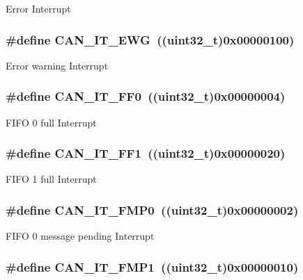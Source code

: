 \label{group__CAN__interrupts_ga65f1781c9165a2e9b5f77f1ed3990741}
Error Interrupt \hypertarget{group__CAN__interrupts_ga8a9f04ddf6ebe169d32b951a8ea135b3}{
\subsubsection[{CAN\_\-IT\_\-EWG}]{\setlength{\rightskip}{0pt plus 5cm}\#define CAN\_\-IT\_\-EWG~((uint32\_\-t)0x00000100)}}
\label{group__CAN__interrupts_ga8a9f04ddf6ebe169d32b951a8ea135b3}
Error warning Interrupt \hypertarget{group__CAN__interrupts_gabf63043d9216de80ddc7ffe57b23ef67}{
\subsubsection[{CAN\_\-IT\_\-FF0}]{\setlength{\rightskip}{0pt plus 5cm}\#define CAN\_\-IT\_\-FF0~((uint32\_\-t)0x00000004)}}
\label{group__CAN__interrupts_gabf63043d9216de80ddc7ffe57b23ef67}
FIFO 0 full Interrupt \hypertarget{group__CAN__interrupts_ga93b86d884ce0624b4b36c991fd75fc1c}{
\subsubsection[{CAN\_\-IT\_\-FF1}]{\setlength{\rightskip}{0pt plus 5cm}\#define CAN\_\-IT\_\-FF1~((uint32\_\-t)0x00000020)}}
\label{group__CAN__interrupts_ga93b86d884ce0624b4b36c991fd75fc1c}
FIFO 1 full Interrupt \hypertarget{group__CAN__interrupts_ga3fe6fbf53e9d692957e87ad329bcd362}{
\subsubsection[{CAN\_\-IT\_\-FMP0}]{\setlength{\rightskip}{0pt plus 5cm}\#define CAN\_\-IT\_\-FMP0~((uint32\_\-t)0x00000002)}}
\label{group__CAN__interrupts_ga3fe6fbf53e9d692957e87ad329bcd362}
FIFO 0 message pending Interrupt \hypertarget{group__CAN__interrupts_gaa0e101053fb203629e0e9a954213e71e}{
\subsubsection[{CAN\_\-IT\_\-FMP1}]{\setlength{\rightskip}{0pt plus 5cm}\#define CAN\_\-IT\_\-FMP1~((uint32\_\-t)0x00000010)}}
